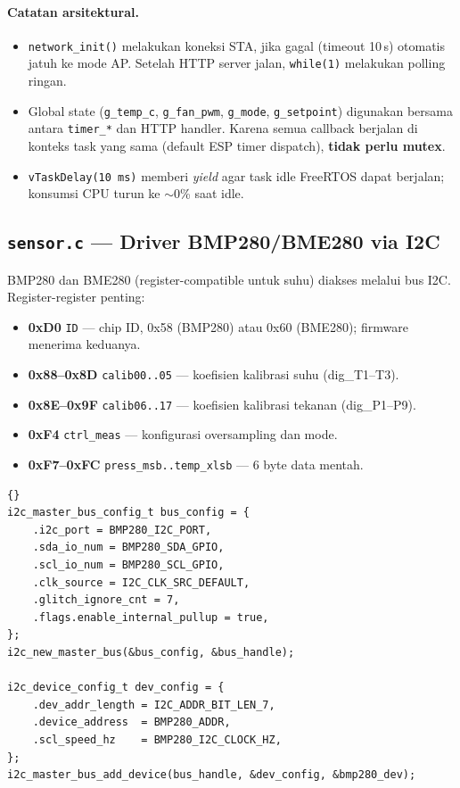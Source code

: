\documentclass[11pt,a4paper]{article}
\begin{document}
\paragraph{Catatan arsitektural.}
\begin{itemize}
    \item \texttt{network\_init()} melakukan koneksi STA, jika gagal (timeout 10\,s) otomatis jatuh ke mode AP. Setelah HTTP server jalan, \texttt{while(1)} melakukan polling ringan.
    \item Global state (\texttt{g\_temp\_c}, \texttt{g\_fan\_pwm}, \texttt{g\_mode}, \texttt{g\_setpoint}) digunakan bersama antara \texttt{timer\_*} dan HTTP handler. Karena semua callback berjalan di konteks task yang sama (default ESP timer dispatch), \textbf{tidak perlu mutex}.
    \item \texttt{vTaskDelay(10\,ms)} memberi \emph{yield} agar task idle FreeRTOS dapat berjalan; konsumsi CPU turun ke $\sim$0\% saat idle.
\end{itemize}

\subsection{\texttt{sensor.c} --- Driver BMP280/BME280 via I2C}

BMP280 dan BME280 (register-compatible untuk suhu) diakses melalui bus I2C. Register-register penting:
\begin{itemize}
    \item \textbf{0xD0} \texttt{ID} --- chip ID, 0x58 (BMP280) atau 0x60 (BME280); firmware menerima keduanya.
    \item \textbf{0x88--0x8D} \texttt{calib00..05} --- koefisien kalibrasi suhu (dig\_T1--T3).
    \item \textbf{0x8E--0x9F} \texttt{calib06..17} --- koefisien kalibrasi tekanan (dig\_P1--P9).
    \item \textbf{0xF4} \texttt{ctrl\_meas} --- konfigurasi oversampling dan mode.
    \item \textbf{0xF7--0xFC} \texttt{press\_msb..temp\_xlsb} --- 6 byte data mentah.
\end{itemize}

\begin{lstlisting}[caption={Inisialisasi I2C master dengan ESP-IDF v5.x driver baru}]{}
i2c_master_bus_config_t bus_config = {
    .i2c_port = BMP280_I2C_PORT,
    .sda_io_num = BMP280_SDA_GPIO,
    .scl_io_num = BMP280_SCL_GPIO,
    .clk_source = I2C_CLK_SRC_DEFAULT,
    .glitch_ignore_cnt = 7,
    .flags.enable_internal_pullup = true,
};
i2c_new_master_bus(&bus_config, &bus_handle);

i2c_device_config_t dev_config = {
    .dev_addr_length = I2C_ADDR_BIT_LEN_7,
    .device_address  = BMP280_ADDR,
    .scl_speed_hz    = BMP280_I2C_CLOCK_HZ,
};
i2c_master_bus_add_device(bus_handle, &dev_config, &bmp280_dev);
\end{lstlisting}
\end{document}
